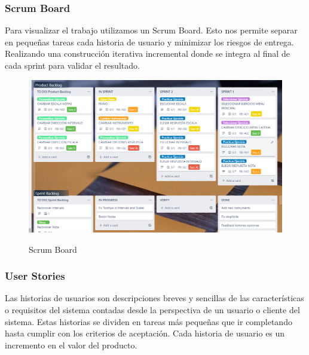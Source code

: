\documentclass[12pt,twoside,titlepage]{report}
\begin{document}
\subsubsection{Scrum Board}

Para visualizar el trabajo utilizamos un Scrum Board. Esto nos permite separar en pequeñas tareas cada historia de usuario y minimizar los riesgos de entrega. Realizando una construcción iterativa incremental donde se integra al final de cada sprint para validar el resultado. 

\begin{figure}[H]
    \centering
    \includegraphics[scale=0.47]{KANBAN}
    \label{fig:ScrumBoard}
    \caption{Scrum Board}
\end{figure}

\subsubsection{User Stories}

Las historias de usuarios son descripciones breves y sencillas de las características o requisitos del sistema contadas desde la perspectiva de un usuario o cliente del sistema. Estas historias se dividen en tareas más pequeñas que ir completando hasta cumplir con los criterios de aceptación. Cada historia de usuario es un incremento en el valor del producto.
\end{document}

